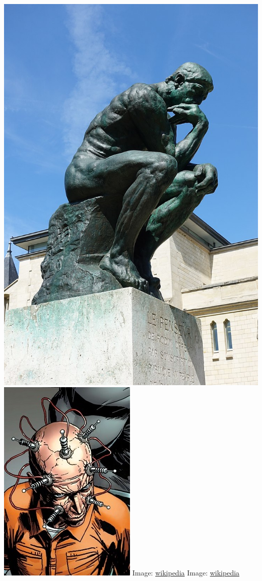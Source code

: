 \documentclass[fleqn]{beamer} %
\begin{document}
\begin{frame}[label=sectionIV]
\begin{multicols}{2}
			\includegraphics[scale=.1]{thinker_rodin.png}
			\includegraphics[scale=.25]{thinker_dc_comics.png}
			{\tiny Image: \href{https://en.wikipedia.org/wiki/Thinker_(DC_Comics)}{wikipedia}}
			{\tiny Image: \href{https://en.wikipedia.org/wiki/The_Thinker}{wikipedia}}
		\end{multicols}	

	\end{frame}
\end{document}
